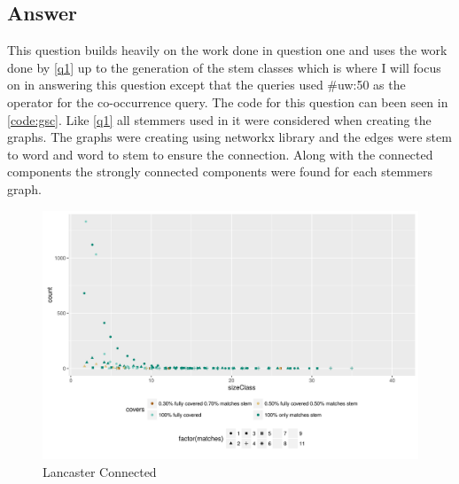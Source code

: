 \documentclass[11pt]{article}
\newenvironment{code}{\captionsetup{type=listing}}{}
\begin{document}
\subsection{Answer}
This question builds heavily on the work done in question one and uses the work done by \autoref{q1} up to the generation of the stem classes which is where I will focus on in answering this question except that the queries used \#uw:50 as the operator for the co-occurrence query. The code for this question can been seen in \autoref{code:gsc}.  Like \autoref{q1} all stemmers used in it were considered when creating the graphs. The graphs were creating using networkx library and the edges were stem to word and word to stem to ensure the connection. Along with the connected components the strongly connected components were found for each stemmers graph.
\begin{figure}[h]
\centering
\includegraphics[scale=0.8]{Lancasterconnected.png}
\caption{Lancaster Connected}
\label{fig:lanc}
\end{figure}
\begin{code}
 \label{code:gsc}
\end{code}
\newpage
\begin{code}
 \label{code:rg}
\end{code}

\newpage
\end{document}
